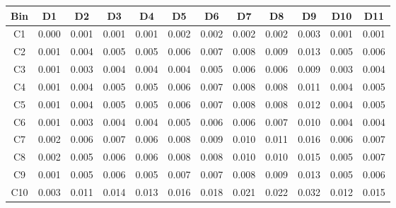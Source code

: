\begin{tabular}{c@{~~~}c@{~~}c@{~~}c@{~~}c@{~~}c@{~~}c@{~~}c@{~~}c@{~~}c@{~~}c@{~~}c}
\hline
 \hline
Bin	& D1 & D2 & D3 & D4 & D5 & D6 & D7 & D8 & D9 & D10 & D11 \\
\hline
C1	&  0.000 &  0.001 &  0.001 &  0.001 &  0.002 &  0.002 &  0.002 &  0.002 &  0.003 &  0.001 &  0.001 \\
C2	&  0.001 &  0.004 &  0.005 &  0.005 &  0.006 &  0.007 &  0.008 &  0.009 &  0.013 &  0.005 &  0.006 \\
C3	&  0.001 &  0.003 &  0.004 &  0.004 &  0.004 &  0.005 &  0.006 &  0.006 &  0.009 &  0.003 &  0.004 \\
C4	&  0.001 &  0.004 &  0.005 &  0.005 &  0.006 &  0.007 &  0.008 &  0.008 &  0.011 &  0.004 &  0.005 \\
C5	&  0.001 &  0.004 &  0.005 &  0.005 &  0.006 &  0.007 &  0.008 &  0.008 &  0.012 &  0.004 &  0.005 \\
C6	&  0.001 &  0.003 &  0.004 &  0.004 &  0.005 &  0.006 &  0.006 &  0.007 &  0.010 &  0.004 &  0.004 \\
C7	&  0.002 &  0.006 &  0.007 &  0.006 &  0.008 &  0.009 &  0.010 &  0.011 &  0.016 &  0.006 &  0.007 \\
C8	&  0.002 &  0.005 &  0.006 &  0.006 &  0.008 &  0.008 &  0.010 &  0.010 &  0.015 &  0.005 &  0.007 \\
C9	&  0.001 &  0.005 &  0.006 &  0.005 &  0.007 &  0.007 &  0.008 &  0.009 &  0.013 &  0.005 &  0.006 \\
C10	&  0.003 &  0.011 &  0.014 &  0.013 &  0.016 &  0.018 &  0.021 &  0.022 &  0.032 &  0.012 &  0.015 \\
\hline
 \hline
\end{tabular}
